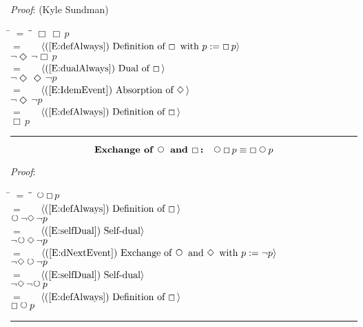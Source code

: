 \documentclass[12pt, fleqn, leqno]{article}
\newcommand{\lgap}{2pt}                             %
\newcommand{\mymathindent}{24pt}                    %
\newcommand{\Next}{\;\,\text{\raisebox{3.5pt}{\circle{6}}}}
\newcommand{\Event}{\Diamond\,}
\newcommand{\Always}{\Box\,}
\newcommand{\myqed}{\rule[-.23ex]{1.2ex}{2.0ex}}
\newcommand{\myqedtab}{\hspace{384pt}}              %
\newcommand{\Gll} {\langle}                         %
\newcommand{\Ggg} {\rangle}                         %
\newcommand{\Hint}[1]     {\ \ \ $\Gll              \mbox{#1} \Ggg$ }   %
\begin{document}
\emph{Proof}: (Kyle Sundman)
\begin{tabbing}
\hspace{\mymathindent} \= $= \;$ \= \myqedtab \= \kill
  \> \>   $\Always\Always p$\\[\lgap]
  \> $=$  \>  \Hint{(\ref{E:defAlways}) Definition of $\Always$ with $p := \Always p$}\\[\lgap]
  \> \>   $\neg\Event\neg\Always p$\\[\lgap]
  \> $=$  \>  \Hint{(\ref{E:dualAlways}) Dual of $\Always$}\\[\lgap]
  \> \>   $\neg\Event\Event\neg p$\\[\lgap]
  \> $=$  \>  \Hint{(\ref{E:IdemEvent}) Absorption of $\Event$}\\[\lgap]
  \> \>   $\neg\Event\neg p$\\[\lgap]
  \> $=$  \>  \Hint{(\ref{E:defAlways}) Definition of $\Always$}\\[\lgap]
  \> \>   $\Always p$ \quad \myqed
\end{tabbing}
\begin{equation}\label{E:dNextAlways}
\textbf{Exchange of $\Next$ and $\Always$:}\quad \Next\Always p \equiv \Always\Next p
\end{equation}

\emph{Proof}:
\begin{tabbing}
\hspace{\mymathindent} \= $= \;$ \= \myqedtab \= \kill
  \> \>   $\Next\Always p$\\[\lgap]
  \> $=$  \>  \Hint{(\ref{E:defAlways}) Definition of $\Always$}\\[\lgap]
  \> \>   $\Next\neg\Event\neg p$\\[\lgap]
  \> $=$  \>  \Hint{(\ref{E:selfDual}) Self-dual}\\[\lgap]
  \> \>   $\neg\Next\Event\neg p$\\[\lgap]
  \> $=$  \>  \Hint{(\ref{E:dNextEvent}) Exchange of $\Next$ and $\Event$ with $p := \neg p$}\\[\lgap]
  \> \>   $\neg\Event\Next\neg p$\\[\lgap]
  \> $=$  \>  \Hint{(\ref{E:selfDual}) Self-dual}\\[\lgap]
  \> \>   $\neg\Event\neg\Next p$\\[\lgap]
  \> $=$  \>  \Hint{(\ref{E:defAlways}) Definition of $\Always$}\\[\lgap]
  \> \>   $\Always\Next p$ \quad \myqed
\end{tabbing}
\end{document}
